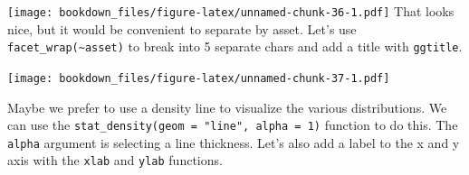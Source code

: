 \documentclass[]{krantz}
\makeatletter
\newenvironment{Shaded}{\begin{snugshade}}{\end{snugshade}}
\newcommand{\KeywordTok}[1]{\textcolor[rgb]{0.13,0.29,0.53}{\textbf{#1}}}
\newcommand{\DataTypeTok}[1]{\textcolor[rgb]{0.13,0.29,0.53}{#1}}
\newcommand{\DecValTok}[1]{\textcolor[rgb]{0.00,0.00,0.81}{#1}}
\newcommand{\FloatTok}[1]{\textcolor[rgb]{0.00,0.00,0.81}{#1}}
\newcommand{\StringTok}[1]{\textcolor[rgb]{0.31,0.60,0.02}{#1}}
\newcommand{\OperatorTok}[1]{\textcolor[rgb]{0.81,0.36,0.00}{\textbf{#1}}}
\newcommand{\NormalTok}[1]{#1}
\newenvironment{kframe}{%
\medskip{}
\setlength{\fboxsep}{.8em}
 \def\at@end@of@kframe{}%
 \ifinner\ifhmode%
  \def\at@end@of@kframe{\end{minipage}}%
  \begin{minipage}{\columnwidth}%
 \fi\fi%
 \def\FrameCommand##1{\hskip\@totalleftmargin \hskip-\fboxsep
 \colorbox{shadecolor}{##1}\hskip-\fboxsep
     \hskip-\linewidth \hskip-\@totalleftmargin \hskip\columnwidth}%
 \MakeFramed {\advance\hsize-\width
   \@totalleftmargin\z@ \linewidth\hsize
   \@setminipage}}%
 {\par\unskip\endMakeFramed%
 \at@end@of@kframe}
\renewenvironment{Shaded}{\begin{kframe}}{\end{kframe}}
\makeatother
\begin{document}
\texttt{[image: bookdown\_files/figure-latex/unnamed-chunk-36-1.pdf]}
That looks nice, but it would be convenient to separate by asset. Let's
use \texttt{facet\_wrap(\textasciitilde{}asset)} to break into 5
separate chars and add a title with \texttt{ggtitle}.

\begin{Shaded}
\end{Shaded}

\texttt{[image: bookdown\_files/figure-latex/unnamed-chunk-37-1.pdf]}

Maybe we prefer to use a density line to visualize the various
distributions. We can use the
\texttt{stat\_density(geom\ =\ "line",\ alpha\ =\ 1)} function to do
this. The \texttt{alpha} argument is selecting a line thickness. Let's
also add a label to the x and y axis with the \texttt{xlab} and
\texttt{ylab} functions.

\begin{Shaded}
\end{Shaded}
\end{document}
